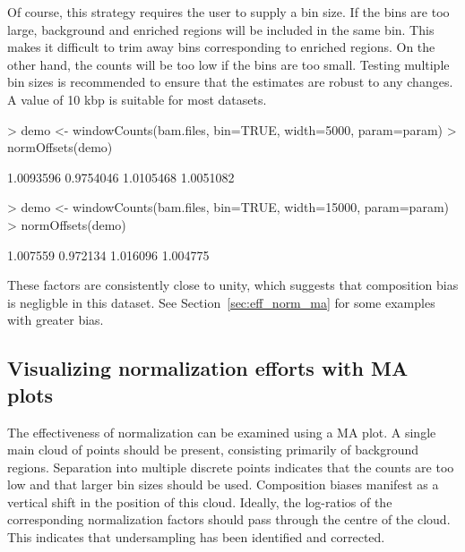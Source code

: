 \documentclass[12pt]{report}
\renewenvironment{Schunk}{\vspace{0pt}}{\vspace{0pt}}
\begin{document}
Of course, this strategy requires the user to supply a bin size. 
If the bins are too large, background and enriched regions will be included in the same bin. 
This makes it difficult to trim away bins corresponding to enriched regions.
On the other hand, the counts will be too low if the bins are too small.
Testing multiple bin sizes is recommended to ensure that the estimates are robust to any changes. 
A value of 10 kbp is suitable for most datasets.

\begin{Schunk}
\begin{Sinput}
> demo <- windowCounts(bam.files, bin=TRUE, width=5000, param=param)
> normOffsets(demo)
\end{Sinput}
\begin{Soutput}
[1] 1.0093596 0.9754046 1.0105468 1.0051082
\end{Soutput}
\begin{Sinput}
> demo <- windowCounts(bam.files, bin=TRUE, width=15000, param=param)
> normOffsets(demo)
\end{Sinput}
\begin{Soutput}
[1] 1.007559 0.972134 1.016096 1.004775
\end{Soutput}
\end{Schunk}

These factors are consistently close to unity, which suggests that composition bias is negligble in this dataset.
See Section~\ref{sec:eff_norm_ma} for some examples with greater bias.

\subsection{Visualizing normalization efforts with MA plots}
The effectiveness of normalization can be examined using a MA plot. 
A single main cloud of points should be present, consisting primarily of background regions.
Separation into multiple discrete points indicates that the counts are too low and that larger bin sizes should be used. 
Composition biases manifest as a vertical shift in the position of this cloud. 
Ideally, the log-ratios of the corresponding normalization factors should pass through the centre of the cloud. 
This indicates that undersampling has been identified and corrected.

\end{document}
